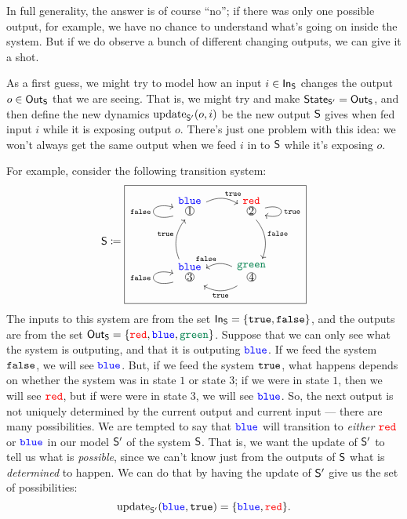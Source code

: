 \documentclass[DynamicalBook]{subfiles}
\begin{document}
In full generality, the answer is of course ``no''; if there was only one
possible output, for example, we have no chance to understand what's going on
inside the system. But if we do observe a bunch of different changing outputs,
we can give it a shot.

As a first guess, we might try to model how an input $i \in \mathsf{In}_{\mathsf{S}}$ changes the
output $o \in \mathsf{Out}_{\mathsf{S}}$ that we are seeing. That is, we might try and make
$\mathsf{State}_{\mathsf{S'}} = \mathsf{Out}_{\mathsf{S}}$, and then define the new dynamics $\mathrm{update}_{\mathsf{S'}}(o, i)$ be
the new output $\mathsf{S}$ gives when fed input $i$ while it is exposing output
$o$. There's just one problem with this idea: we won't always get the same
output when we feed $i$ in to $\mathsf{S}$ while it's exposing $o$.

For example, consider the following transition system:
\begin{equation}\label{eqn.possibilistic_transition_1}
\Sys{S} \coloneqq
  \begin{tikzpicture}[baseline=(bl)]
	\node[draw] (bl) {
  \begin{tikzcd}[column sep=small]
    \LMOO{1}{\Blue} \ar[loop left, "\const{false}"] \ar[rr, bend left, "\const{true}"] \ar[dd, leftarrow, bend right, "\true"'] &  & \LMOO{2}{\Red} \ar[loop right, "\true"] \ar[dd, bend left, "\const{false}" ]\\
    & & \\
    \LMOO{3}{\Blue} \ar[loop left, "\false"] \ar[rr, leftarrow, bend left, "\false"] \ar[rr, leftarrow, bend right, "\true"'] & & \LMOO{4}{\Green}
  \end{tikzcd}};
\end{tikzpicture}
\end{equation}
The inputs to this system are from the set $\mathsf{In}_{\mathsf{S}} = \{\mathtt{true}, \mathtt{false}\}$, and
the outputs are from the set $\Out{S} = \{\Red, \Blue, \Green\}$. Suppose that we can only see
what the system is outputing, and that it is outputing ${\color{blue} \mathtt{blue}}$. If we feed the
system $\mathtt{false}$, we will see ${\color{blue} \mathtt{blue}}$. But, if we feed the system $\mathtt{true}$, what
happens depends on whether the system was in state $1$ or state $3$; if we were
in state $1$, then we will see ${\color{red} \mathtt{red}}$, but if were were in state $3$, we will
see ${\color{blue} \mathtt{blue}}$. So, the next output is not uniquely determined by the current
output and current input --- there are many possibilities. We are tempted to say
that ${\color{blue} \mathtt{blue}}$ will transition to \emph{either} ${\color{red} \mathtt{red}}$ or ${\color{blue} \mathtt{blue}}$ in our model
$\mathsf{S'}$ of the system $\mathsf{S}$. That is, we want the update of $\mathsf{S'}$ to
tell us what is \emph{possible}, since we can't know just from the outputs of
$\mathsf{S}$ what is \emph{determined} to happen. We can do that by having the
update of $\mathsf{S'}$ give us the set of possibilities:
$$\mathrm{update}_{\mathsf{S'}}({\color{blue} \mathtt{blue}}, \mathtt{true}) = \{{\color{blue} \mathtt{blue}}, {\color{red} \mathtt{red}}\}.$$
\end{document}
